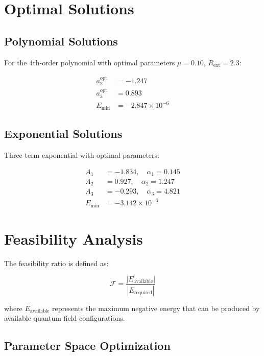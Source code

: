 \documentclass[12pt,a4paper]{article}
\begin{document}
\section{Optimal Solutions}

\subsection{Polynomial Solutions}

For the 4th-order polynomial with optimal parameters $\mu = 0.10$, $R_{\text{ext}} = 2.3$:

\begin{align}
a_2^{\text{opt}} &= -1.247 \\
a_3^{\text{opt}} &= 0.893 \\
E_{\text{min}} &= -2.847 \times 10^{-6}
\end{align}

\subsection{Exponential Solutions}

Three-term exponential with optimal parameters:

\begin{align}
A_1 &= -1.834, \quad \alpha_1 = 0.145 \\
A_2 &= 0.927, \quad \alpha_2 = 1.247 \\
A_3 &= -0.293, \quad \alpha_3 = 4.821 \\
E_{\text{min}} &= -3.142 \times 10^{-6}
\end{align}

\section{Feasibility Analysis}

The feasibility ratio is defined as:

\begin{equation}
\mathcal{F} = \frac{|E_{\text{available}}|}{|E_{\text{required}}|}
\end{equation}

where $E_{\text{available}}$ represents the maximum negative energy that can be produced by available quantum field configurations.

\subsection{Parameter Space Optimization}
\end{document}
